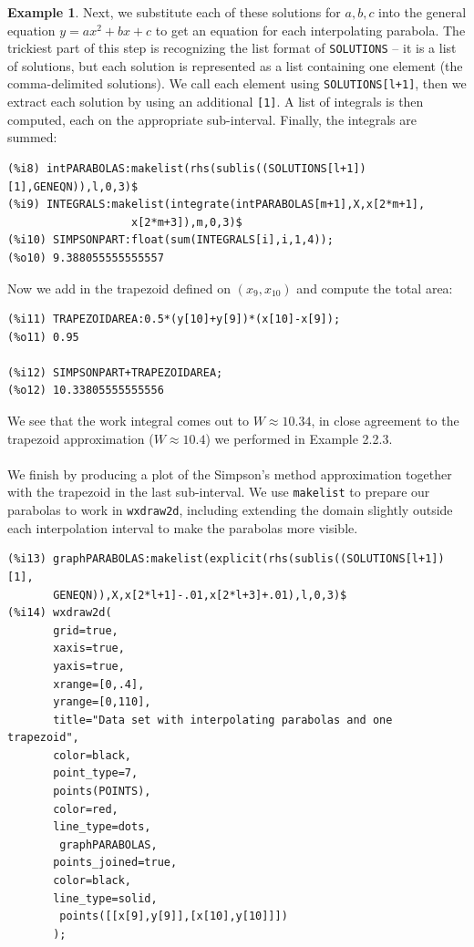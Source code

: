 \documentclass[10.5pt,twoside]{report}
\theoremstyle{definition}
\newtheorem{exmp}{Example}[section]
\begin{document}
\begin{exmp}
Next, we substitute each of these solutions for $a,b,c$ into the general equation $y=ax^2+bx+c$ to get an equation for each interpolating parabola.  The trickiest part of this step is recognizing the list format of \verb|SOLUTIONS| -- it is a list of solutions, but each solution is represented as a list containing one element (the comma-delimited solutions).  We call each element using \verb|SOLUTIONS[l+1]|, then we extract each solution by using an additional \verb|[1]|.  A list of integrals is then computed, each on the appropriate sub-interval.  Finally, the integrals are summed:

\begin{verbatim}
(%i8) intPARABOLAS:makelist(rhs(sublis((SOLUTIONS[l+1])[1],GENEQN)),l,0,3)$
(%i9) INTEGRALS:makelist(integrate(intPARABOLAS[m+1],X,x[2*m+1],
                   x[2*m+3]),m,0,3)$
(%i10) SIMPSONPART:float(sum(INTEGRALS[i],i,1,4));
(%o10) 9.388055555555557
\end{verbatim}

Now we add in the trapezoid defined on $(x_{9},x_{10})$ and compute the total area:

\begin{verbatim}
(%i11) TRAPEZOIDAREA:0.5*(y[10]+y[9])*(x[10]-x[9]);
(%o11) 0.95

(%i12) SIMPSONPART+TRAPEZOIDAREA;
(%o12) 10.33805555555556
\end{verbatim}

We see that the work integral comes out to $W\approx 10.34$, in close agreement to the trapezoid approximation ($W\approx 10.4$) we performed in Example 2.2.3.  \\
${}$\\
We finish by producing a plot of the Simpson's method approximation together with the trapezoid in the last sub-interval.  We use \verb|makelist| to prepare our parabolas to work in \verb|wxdraw2d|, including extending the domain slightly outside each interpolation interval to make the parabolas more visible.

\begin{verbatim}
(%i13) graphPARABOLAS:makelist(explicit(rhs(sublis((SOLUTIONS[l+1])[1],
       GENEQN)),X,x[2*l+1]-.01,x[2*l+3]+.01),l,0,3)$
(%i14) wxdraw2d(
       grid=true,
       xaxis=true,
       yaxis=true,
       xrange=[0,.4],
       yrange=[0,110],
       title="Data set with interpolating parabolas and one trapezoid",
       color=black,
       point_type=7,
       points(POINTS),
       color=red,
       line_type=dots,
        graphPARABOLAS,
       points_joined=true,
       color=black,
       line_type=solid,
        points([[x[9],y[9]],[x[10],y[10]]])
       );
\end{verbatim}


\end{exmp}
\end{document}
